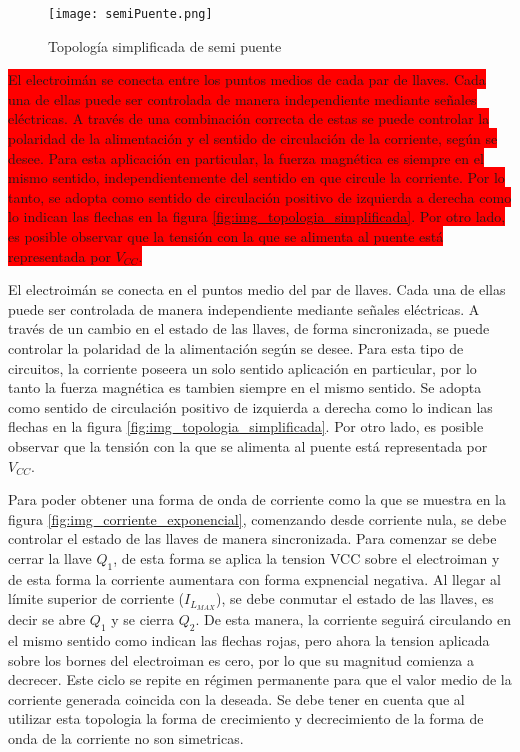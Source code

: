 \begin{figure}[H]
	\centering
	\texttt{[image: semiPuente.png]}
	\caption{Topología simplificada de semi puente}
	\label{fig:img_topologia_semipuente}
\end{figure} 

\colorbox{red}{
El electroimán se conecta entre los puntos medios de cada par de llaves. Cada una de ellas puede ser controlada de manera independiente mediante señales eléctricas. A través de una combinación correcta de estas se puede controlar la polaridad de la alimentación y el sentido de circulación de la corriente, según se desee. Para esta aplicación en particular, la fuerza magnética es siempre en el mismo sentido, independientemente del sentido en que circule la corriente. Por lo tanto, se adopta como sentido de circulación positivo de izquierda a derecha como lo indican las flechas en la figura \ref{fig:img_topologia_simplificada}. Por otro lado, es posible observar que la tensión con la que se alimenta al puente está representada por $V_{CC}$.
}


El electroimán se conecta en el puntos medio del par de llaves. Cada una de ellas puede ser controlada de manera independiente mediante señales eléctricas. A través de un cambio en el estado de las llaves, de forma sincronizada, se puede controlar la polaridad de la alimentación según se desee. Para esta tipo de circuitos, la corriente poseera un solo sentido aplicación en particular, por lo tanto la fuerza magnética es tambien siempre en el mismo sentido. Se adopta como sentido de circulación positivo de izquierda a derecha como lo indican las flechas en la figura \ref{fig:img_topologia_simplificada}. Por otro lado, es posible observar que la tensión con la que se alimenta al puente está representada por $V_{CC}$.

Para poder obtener una forma de onda de corriente como la que se muestra en la figura \ref{fig:img_corriente_exponencial}, comenzando desde corriente nula, se debe controlar el estado de las llaves de manera sincronizada. Para comenzar se debe cerrar la llave  $Q_1$, de esta forma se aplica la tension VCC sobre el electroiman y de esta forma la corriente aumentara con forma expnencial negativa. Al llegar al límite superior de corriente ($I_{L_{MAX}}$), se debe conmutar el estado de las llaves, es decir se abre $Q_1$ y se cierra $Q_2$. De esta manera, la corriente seguirá circulando en el mismo sentido como indican las flechas rojas, pero ahora la tension aplicada sobre los bornes del electroiman es cero, por lo que su magnitud comienza a decrecer. Este ciclo se repite en régimen permanente para que el valor medio de la corriente generada coincida con la deseada. Se debe tener en cuenta que al utilizar esta topologia la forma de crecimiento y decrecimiento de la forma de onda de la corriente no son simetricas.

